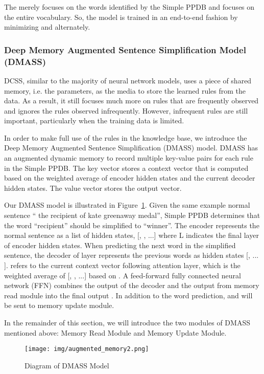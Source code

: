 \documentclass[11pt,a4paper]{article}
\begin{document}
The  merely focuses on the words identified by the Simple PPDB and  focuses on the entire vocabulary. So, the model is trained in an end-to-end fashion by minimizing  and  alternately.

\subsubsection{Deep Memory Augmented Sentence Simplification Model (DMASS)}
DCSS, similar to the majority of neural network models, uses a piece of shared memory, i.e. the parameters, as the media to store the learned rules from the data.
As a result, it still focuses much more on rules that are frequently observed and ignores the rules observed infrequently. 
However, infrequent rules are still important, particularly when the training data is limited. 

In order to make full use of the rules in the knowledge base, we introduce the Deep Memory Augmented Sentence Simplification (DMASS) model. DMASS has an augmented dynamic memory to record multiple key-value pairs for each rule in the Simple PPDB. The key vector stores a context vector that is computed based on the weighted average of encoder hidden states and the current decoder hidden states. The value vector stores the output vector.

Our DMASS model is illustrated in Figure~\ref{fig:augmented_memory}. Given the same example normal sentence `` the recipient of kate greenaway medal'', Simple PPDB determines that the word ``recipient'' should be simplified to ``winner''. 
The encoder represents the normal sentence as a list of hidden states, [, , ...] where L indicates the final layer of encoder hidden states. When predicting the next word in the simplified sentence, the decoder of layer  represents the previous words as hidden states [, ... ].  refers to the current context vector following attention layer, which is the weighted average of [, , ...] based on . 
A feed-forward fully connected neural network (FFN) combines the output of the decoder and the output from memory read module into the final output . In addition to the word prediction,  and  will be sent to memory update module.

In the remainder of this section, we will introduce the two modules of DMASS mentioned above:
Memory Read Module and Memory Update Module.



\vspace{-0.5em}
\begin{figure}[h]
\begin{center}
   \texttt{[image: img/augmented\_memory2.png]}
\end{center}

\vspace{-0.5em}
\caption{Diagram of DMASS Model}
\label{fig:augmented_memory}
\vspace{-0.5em}
\end{figure}
\end{document}
